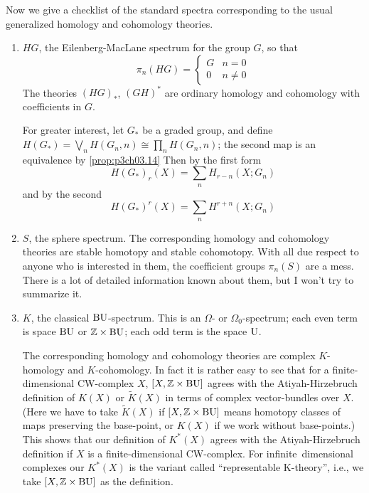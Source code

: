 \documentclass[../main]{subfiles}
\begin{document}
Now we give a checklist of the standard spectra corresponding to the usual generalized homology and cohomology theories.
\begin{enumerate}[label = (\roman*)]
    \item $HG$, the Eilenberg-MacLane spectrum for the group $G$, so that
    \[\pi_n(HG) = 
    \begin{cases}
    G &n=0 \\
    0 &n\neq 0
    \end{cases}\]
    The theories $(HG)_\ast$, $(GH)^\ast$ are ordinary homology and cohomology with coefficients in $G$.
    
    For greater interest, let $G_\ast$ be a graded group, and define \newline $H(G_\ast)=\bigvee_n H(G_n, n)\cong \prod_n H(G_n, n)$; the second map is an equivalence by \ref{prop:p3ch03.14} Then by the first form
    \[H(G_\ast)_r(X)=\sum_n H_{r-n}(X;G_n)\]
    and by the second
    \[H(G_\ast)^r(X)=\sum_n H^{r+n}(X;G_n)\]
    \item $S$, the sphere spectrum. The corresponding homology and cohomology theories are stable homotopy and stable cohomotopy. With all due respect to anyone who is interested in them, the coefficient groups $\pi_n(S)$ are a mess. There is a lot of detailed information known about them, but I won't try to summarize it.
    \item $K$, the classical $\mathrm{BU}$-spectrum. This is an $\Omega$- or $\Omega_0$-spectrum; each even term is space $\mathrm{BU}$ or $\mathbb{Z}\times \mathrm{BU}$; each odd term is the space $\mathrm{U}$.
    
    The corresponding homology and cohomology theories are complex $K$-homology and $K$-cohomology. In fact it is rather easy to see that for a finite-dimensional CW-complex $X$, $[X, \mathbb{Z}\times \mathrm{BU}]$ agrees with the Atiyah-Hirzebruch definition of $K(X)$ or $\widetilde{K}(X)$ in terms of complex vector-bundles over $X$. (Here we have to take $\widetilde{K}(X)$ if $[X, \mathbb{Z}\times \mathrm{BU}]$ means homotopy classes of maps preserving the base-point, or $K(X)$ if we work without base-points.) This shows that our definition of $K^\ast(X)$ agrees with the Atiyah-Hirzebruch definition if $X$ is a finite-dimensional CW-complex. For infinite~dimensional complexes our $K^\ast(X)$ is the variant called ``representable K-theory'', i.e., we take $[X,\mathbb{Z}\times \mathrm{BU}]$ as the definition. 
    

\end{enumerate}
\end{document}
